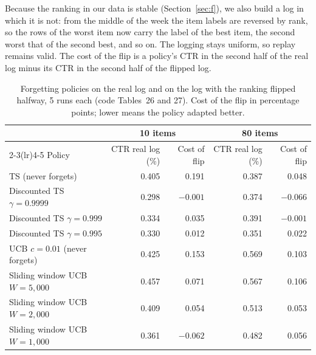 \documentclass[11pt]{article}
\begin{document}
Because the ranking in our data is stable (Section~\ref{sec:f}), we also build
a log in which it is not: from the middle of the week the item labels are
reversed by rank, so the rows of the worst item now carry the label of the
best item, the second worst that of the second best, and so on. The logging
stays uniform, so replay remains valid. The cost of the flip is a policy's CTR
in the second half of the real log minus its CTR in the second half of the
flipped log.

\begin{table}[H]
  \centering
  \caption{Forgetting policies on the real log and on the log with the ranking
    flipped halfway, 5 runs each (code Tables~26 and 27). Cost of the flip in
    percentage points; lower means the policy adapted better.}
  \label{tab:g}
  \small
  \begin{tabular}{lrrrr}
    \toprule
    & \multicolumn{2}{c}{10 items} & \multicolumn{2}{c}{80 items} \\
    \cmidrule(lr){2-3}\cmidrule(lr){4-5}
    Policy & CTR real log (\%) & Cost of flip & CTR real log (\%) & Cost of flip \\
    \midrule
    TS (never forgets)                 & 0.405 &  0.191 & 0.387 &  0.048 \\
    Discounted TS $\gamma=0.9999$      & 0.298 & $-0.001$ & 0.374 & $-0.066$ \\
    Discounted TS $\gamma=0.999$       & 0.334 &  0.035 & 0.391 & $-0.001$ \\
    Discounted TS $\gamma=0.995$       & 0.330 &  0.012 & 0.351 &  0.022 \\
    UCB $c=0.01$ (never forgets)       & 0.425 &  0.153 & 0.569 &  0.103 \\
    Sliding window UCB $W=5{,}000$     & 0.457 &  0.071 & 0.567 &  0.106 \\
    Sliding window UCB $W=2{,}000$     & 0.409 &  0.054 & 0.513 &  0.053 \\
    Sliding window UCB $W=1{,}000$     & 0.361 & $-0.062$ & 0.482 &  0.056 \\
    \bottomrule
  \end{tabular}
\end{table}
\end{document}
